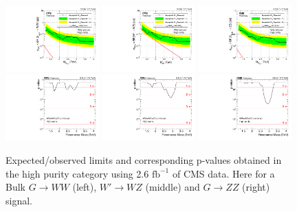 \begin{figure}[h!]
\centering
\includegraphics[width=0.32\textwidth]{figures/analysis/search1/AN-15-211/limits/brazilianFlag_BulkWW_VVHP_new_combined_purity_13TeV_wPDF.pdf}
\includegraphics[width=0.32\textwidth]{figures/analysis/search1/AN-15-211/limits/brazilianFlag_WZ_VVHP_new_combined_purity_13TeV_wPDF.pdf}
\includegraphics[width=0.32\textwidth]{figures/analysis/search1/AN-15-211/limits/brazilianFlag_BulkZZ_VVHP_new_combined_purity_13TeV_wPDF.pdf}\\
\includegraphics[width=0.32\textwidth]{figures/analysis/search1/AN-15-211/pvalues/pvalue_BulkWWinVVnew_high_purity.pdf}
\includegraphics[width=0.32\textwidth]{figures/analysis/search1/AN-15-211/pvalues/pvalue_WZinVVnew_high_purity.pdf}
\includegraphics[width=0.32\textwidth]{figures/analysis/search1/AN-15-211/pvalues/pvalue_BulkZZinVVnew_high_purity.pdf}
\caption{Expected/observed limits and corresponding p-values obtained in the high purity category using 2.6 $\textrm{fb}^{-1}$ of CMS data. Here for a Bulk $G\rightarrow WW$ (left), $W'\rightarrow WZ$ (middle) and $G\rightarrow ZZ$ (right) signal.}
\label{fig:searchI:Limits_HP}
\end{figure}


